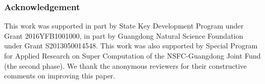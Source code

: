\documentclass[runningheads]{llncs}
\begin{document}
\subsubsection{Acknowledgement} This work was supported in part by State Key Development Program under Grant 2016YFB1001000, in part by Guangdong Natural Science Foundation under Grant S2013050014548. This work was also supported by Special Program for Applied Research on Super Computation of the NSFC-Guangdong Joint Fund (the second phase). We thank the anonymous reviewers for their constructive comments on improving this paper. 



\end{document}
